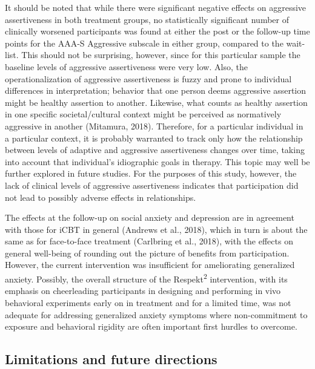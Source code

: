 \documentclass[preprint,
3p]{elsarticle} %
\begin{document}
It should be noted that while there were significant negative effects on
aggressive assertiveness in both treatment groups, no statistically
significant number of clinically worsened participants was found at
either the post or the follow-up time points for the AAA-S Aggressive
subscale in either group, compared to the wait-list. This should not be
surprising, however, since for this particular sample the baseline
levels of aggressive assertiveness were very low. Also, the
operationalization of aggressive assertiveness is fuzzy and prone to
individual differences in interpretation; behavior that one person deems
aggressive assertion might be healthy assertion to another. Likewise,
what counts as healthy assertion in one specific societal/cultural
context might be perceived as normatively aggressive in another
(Mitamura, 2018). Therefore, for a particular individual in a particular
context, it is probably warranted to track only how the relationship
between levels of adaptive and aggressive assertiveness changes over
time, taking into account that individual's idiographic goals in
therapy. This topic may well be further explored in future studies. For
the purposes of this study, however, the lack of clinical levels of
aggressive assertiveness indicates that participation did not lead to
possibly adverse effects in relationships.

The effects at the follow-up on social anxiety and depression are in
agreement with those for iCBT in general (Andrews et al., 2018), which
in turn is about the same as for face-to-face treatment (Carlbring et
al., 2018), with the effects on general well-being of rounding out the
picture of benefits from participation. However, the current
intervention was insufficient for ameliorating generalized anxiety.
Possibly, the overall structure of the Respekt\textsuperscript{2}
intervention, with its emphasis on cheerleading participants in
designing and performing in vivo behavioral experiments early on in
treatment and for a limited time, was not adequate for addressing
generalized anxiety symptoms where non-commitment to exposure and
behavioral rigidity are often important first hurdles to overcome.

\hypertarget{limitations-and-future-directions}{%
\subsection{Limitations and future
directions}\label{limitations-and-future-directions}}
\end{document}
